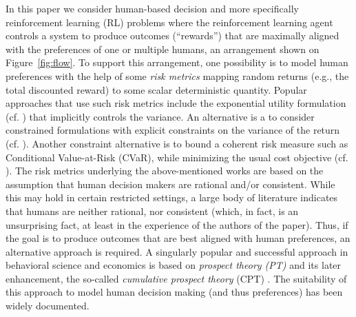 \documentclass[11pt,letterpaper,english]{article}
\begin{document}
In this paper we consider human-based decision and more specifically reinforcement learning (RL) problems 
where the  reinforcement learning agent controls a system 
to produce outcomes (``rewards'') that are maximally aligned with the preferences of 
one or multiple humans, an arrangement shown on Figure~\ref{fig:flow}.
To support this arrangement, one possibility is to model human preferences 
with the help of some \emph{risk metrics} mapping random returns 
(e.g., the total discounted reward) to some scalar deterministic quantity.
Popular approaches that use such risk metrics include the exponential utility formulation 
(cf. \cite{borkar2010learning}) that implicitly controls the variance.
An alternative is a to consider constrained formulations 
with explicit constraints on the variance of the return (cf. \cite{tamar2012policy,Prashanth13AC}). 
Another constraint alternative is to bound a coherent risk measure such as Conditional Value-at-Risk (CVaR), 
while minimizing the usual cost objective (cf. \cite{borkar2010risk,prashanth2014policy}).  
The risk metrics underlying the above-mentioned works 
are based on the assumption that human decision makers are rational and/or consistent.
While this may hold in certain restricted settings, a large body of literature indicates that humans are neither rational,
nor consistent (which, in fact, is an unsurprising fact, at least in the experience of the authors of the paper).
Thus, if the goal is to produce outcomes that are best aligned with human preferences,
an alternative approach is required.
A singularly popular and successful approach in behavioral science and economics
is based on \textit{prospect theory (PT)} \cite{kahneman1979prospect} 
and its later enhancement, the so-called \textit{cumulative prospect theory} (CPT) \cite{tversky1992advances}.
The suitability of this approach to model human decision making (and thus preferences) has been widely documented.
\end{document}
